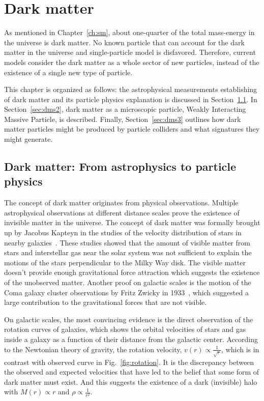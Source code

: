 \chapter{Dark matter}
\label{ch:dm}
\par As mentioned in Chapter~\ref{ch:sm}, about one-quarter of the total mass-energy in the universe is dark matter. No known particle that can account for the dark matter in the universe and single-particle model is disfavored. Therefore, current models consider the dark matter as a whole sector of new particles, instead of the existence of a single new type of particle.

\par This chapter is organized as follows: the astrophysical measurements establishing of dark matter and its particle physics explanation is discussed in Section~\ref{sec:dms1}. In Section~\ref{sec:dms2}, dark matter as a microscopic particle, Weakly Interacting Massive Particle, is described. Finally, Section~\ref{sec:dms3} outlines how dark matter particles might be produced by particle colliders and what signatures they might generate.

\section{Dark matter: From astrophysics to particle physics}
\label{sec:dms1}

\par The concept of dark matter originates from physical observations. Multiple astrophysical observations at different distance scales prove the existence of invisible matter in the universe. The concept of dark matter was formally brought up by Jacobus Kapteyn in the studies of the velocity distribution of stars in nearby galaxies~\cite{Kapteyn:1922zz}. These studies showed that the amount of visible matter from stars and interstellar gas near the solar system was not sufficient to explain the motions of the stars perpendicular to the Milky Way disk. The visible matter doesn't provide enough gravitational force attraction which suggests the existence of the unobserved matter. Another proof on galactic scales is the motion of the Coma galaxy cluster observations by Fritz Zwicky in 1933~\cite{Zwicky:1933gu}, which suggested a large contribution to the gravitational forces that are not visible.

\par On galactic scales, the most convincing evidence is the direct observation of the rotation curves of galaxies, which shows the orbital velocities of stars and gas inside a galaxy as a function of their distance from the galactic center. According to the Newtonian theory of gravity, the rotation velocity, $v(r) \propto \frac{1}{\sqrt{r}}$, which is in contrast with observed curve in Fig.~\ref{fig:rotation}. It is the discrepancy between the observed and expected velocities that have led to the belief that some form of dark matter must exist. And this suggests the existence of a dark (invisible) halo with $M(r) \propto r$ and $\rho \propto \frac{1}{r^2}$.

